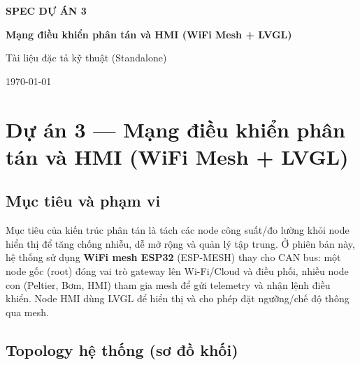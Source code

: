 \documentclass[12pt,a4paper]{report}
\begin{document}
\begin{titlepage}
\centering
\vspace*{2cm}

{\Large \textbf{SPEC DỰ ÁN 3}\par}
\vspace{0.5cm}
{\LARGE \textbf{Mạng điều khiển phân tán và HMI (WiFi Mesh + LVGL)}\par}

\vspace{1.5cm}
{\large Tài liệu đặc tả kỹ thuật (Standalone)\par}

\vfill
{\large \today\par}
\end{titlepage}

\tableofcontents
\clearpage

\chapter{Dự án 3 --- Mạng điều khiển phân tán và HMI (WiFi Mesh + LVGL)}

\section{Mục tiêu và phạm vi}
Mục tiêu của kiến trúc phân tán là tách các node công suất/đo lường khỏi node hiển thị để tăng chống nhiễu, dễ mở rộng và quản lý tập trung. Ở phiên bản này, hệ thống sử dụng \textbf{WiFi mesh ESP32} (ESP-MESH) thay cho CAN bus: một node gốc (root) đóng vai trò gateway lên Wi-Fi/Cloud và điều phối, nhiều node con (Peltier, Bơm, HMI) tham gia mesh để gửi telemetry và nhận lệnh điều khiển. Node HMI dùng LVGL để hiển thị và cho phép đặt ngưỡng/chế độ thông qua mesh.

\section{Topology hệ thống (sơ đồ khối)}
\end{document}
